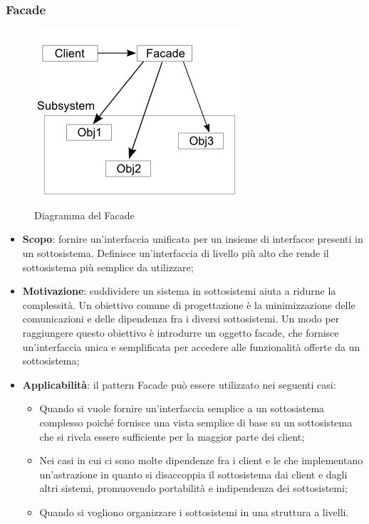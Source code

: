 		\subsubsection{Facade}
		\begin{figure}[H]
		\centering
		\includegraphics[width=0.4\linewidth]{GraficiAppendici/facade.png}
		\caption{Diagramma del  Facade}
	\end{figure}
		\begin{itemize}
		\item \textbf{Scopo}: fornire un’interfaccia unificata per un insieme di interfacce presenti in un
sottosistema. Definisce un’interfaccia di livello più alto che rende il sottosistema più semplice da utilizzare;
		\item \textbf{Motivazione}: suddividere un sistema in sottosistemi aiuta a ridurne la complessità.
Un obiettivo comune di progettazione è la minimizzazione delle comunicazioni e delle dipendenza fra i diversi sottosistemi. Un modo per raggiungere questo obiettivo è introdurre un oggetto facade, che fornisce un’interfaccia unica e semplificata per accedere alle funzionalità offerte da un sottosistema;
		\item \textbf{Applicabilità}: il pattern Facade può essere utilizzato nei seguenti casi:
		\begin{itemize}
		\item Quando si vuole fornire un’interfaccia semplice a un sottosistema complesso poiché fornisce una vista semplice di base su un sottosistema che si rivela essere sufficiente per la maggior parte dei client;
		\item Nei casi in cui ci sono molte dipendenze fra i client e le  che implementano un’astrazione in quanto si disaccoppia il sottosistema dai client e dagli altri sistemi, promuovendo portabilità e indipendenza dei sottosistemi;
		\item Quando si vogliono organizzare i sottosistemi in una struttura a livelli.
		\end{itemize}

		\end{itemize}
	
